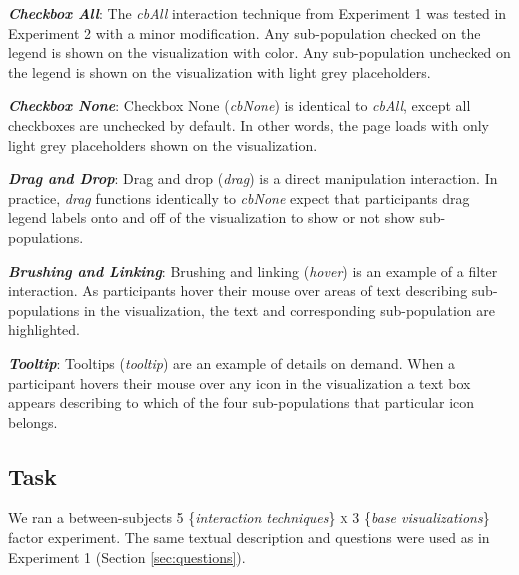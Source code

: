 \begin{compacthang} 
\item \textbf{\textit{Checkbox All}}: The \textit{cbAll} interaction technique from Experiment 1 was tested in Experiment 2 with a minor modification. Any sub-population checked on the legend is shown on the visualization with color. Any sub-population unchecked on the legend is shown on the visualization with light grey placeholders.      

\item \textbf{\textit{Checkbox None}}: Checkbox None (\textit{cbNone}) is identical to \textit{cbAll}, except all checkboxes are unchecked by default. In other words, the page loads with only light grey placeholders shown on the visualization. 
   
 \item \textbf{\textit{Drag and Drop}}: Drag and drop (\textit{drag}) is a direct manipulation interaction. In practice, \textit{drag} functions identically to \textit{cbNone} expect that participants drag legend labels onto and off of the visualization to show or not show sub-populations.%

 \item \textbf{\textit{Brushing and Linking}}:  Brushing and linking (\textit{hover}) is an example of a filter interaction. As participants hover their mouse over areas of text describing sub-populations in the visualization, the text and corresponding sub-population are highlighted. %

\item \textbf{\textit{Tooltip}}: Tooltips (\textit{tooltip}) are an example of details on demand. When a participant hovers their mouse over any icon in the visualization a text box appears describing to which of the four sub-populations that particular icon belongs.  

\end{compacthang}

\subsection{Task}
We ran a between-subjects 5 \{\textit{interaction techniques}\} \textsc{x} 3 \{\textit{base visualizations}\} factor experiment. The same textual description and questions were used as in Experiment 1 (Section \ref{sec:questions}).  

